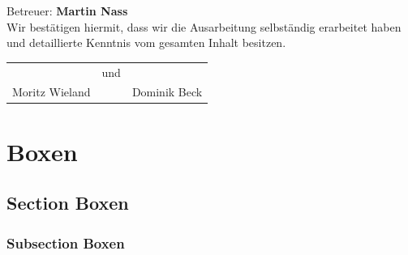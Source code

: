 \documentclass[11pt]{betterallrounder}
\begin{document}
\begin{titlepage}
\begin{center}
        {\large Betreuer: \bfseries{Martin Nass}}\\[1cm]

        {\large Wir bestätigen hiermit, dass wir die Ausarbeitung selbständig erarbeitet haben und
        detaillierte Kenntnis vom gesamten Inhalt besitzen.}\\[1cm]

        \begin{tabular}{rcl}
            \hrulefill & und & \hrulefill\\
            Moritz Wieland & & Dominik Beck
        \end{tabular}
    
        \vfill
    \end{center}
\end{titlepage}


\newpage

\tableofcontents




\chapter*{Boxen}
\setcounter{chapter}{5}
\setcounter{section}{0}
\setcounter{subsection}{0}

\section{Section Boxen}

\subsection{Subsection Boxen}




\end{document}
